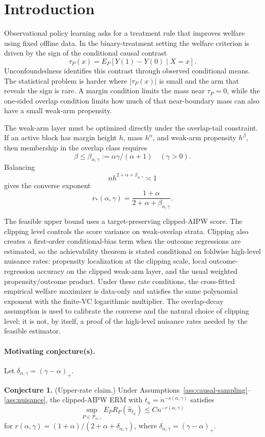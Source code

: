 \documentclass[11pt]{article}
\theoremstyle{definition}
\theoremstyle{plain}
\theoremstyle{remark}
\begin{document}
\section{Introduction}
Observational policy learning asks for a treatment rule that improves welfare
using fixed offline data.  In the binary-treatment setting the welfare
criterion is driven by the sign of the conditional causal contrast
\[
\tau_P(x)=E_P[Y(1)-Y(0)\mid X=x].
\]
Unconfoundedness identifies this contrast through observed conditional means.
The statistical problem is harder where \(|\tau_P(x)|\) is small and the arm
that reveals the sign is rare.  A margin condition limits the mass near
\(\tau_P=0\), while the one-sided overlap condition limits how much of that
near-boundary mass can also have a small weak-arm propensity.

The weak-arm layer must be optimized directly under the overlap-tail
constraint.  If an active block has margin height \(h\), mass \(h^\alpha\),
and weak-arm propensity \(h^\beta\), then membership in the overlap class
requires
\[
\beta\le \beta_{\alpha,\gamma}:=\alpha\gamma/(\alpha+1)
\quad(\gamma>0).
\]
Balancing
\[
n h^{2+\alpha+\beta_{\alpha,\gamma}}\asymp1
\]
gives the converse exponent
\[
r_*(\alpha,\gamma)=
\frac{1+\alpha}{2+\alpha+\beta_{\alpha,\gamma}}.
\]

The feasible upper bound uses a target-preserving clipped-AIPW score.  The
clipping level controls the score variance on weak-overlap strata.  Clipping
also creates a first-order conditional-bias term when the outcome regressions
are estimated, so the achievability theorem is stated conditional on
foldwise high-level nuisance rates: propensity localization at the clipping
scale, local outcome-regression accuracy on the clipped weak-arm layer, and
the usual weighted propensity/outcome product.  Under these rate conditions,
the cross-fitted empirical welfare maximizer is data-only and satisfies the
same polynomial exponent with the finite-VC logarithmic multiplier.  The
overlap-decay assumption is used to calibrate the converse and the natural
choice of clipping level; it is not, by itself, a proof of the high-level
nuisance rates needed by the feasible estimator.

\paragraph{Motivating conjecture(s).}
Let \(\delta_{\alpha,\gamma}=(\gamma-\alpha)_+\).

\textbf{Conjecture 1.} (Upper-rate claim.) Under
Assumptions~\ref{ass:causal-sampling}--\ref{ass:nuisance}, the clipped-AIPW
ERM with \(t_n=n^{-s(\alpha,\gamma)}\) satisfies
\[
\sup_{P\in\mathcal{P}_{\alpha,\gamma}}
E_P R_P(\widehat\pi_{t_n})
\le C n^{-r(\alpha,\gamma)}
\]
for \(r(\alpha,\gamma)=(1+\alpha)/(2+\alpha+\delta_{\alpha,\gamma})\), where
\(\delta_{\alpha,\gamma}=(\gamma-\alpha)_+\).
\end{document}
